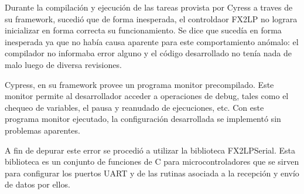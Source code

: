 
Durante la compilación y ejecución de las tareas provista por Cyress a traves de su framework, sucedió que de forma inesperada, el controldaor FX2LP no lograra inicializar en forma correcta su funcionamiento. Se dice que sucedía en forma inesperada ya que no había causa aparente para este comportamiento anómalo: el compilador no informaba error alguno y el código desarrollado no tenía nada de malo luego de diversa revisiones.

Cypress, en su framework provee un programa monitor precompilado. Este monitor permite al desarrollador acceder a operaciones de debug, tales como el chequeo de variables, el pausa y reanudado de ejecuciones, etc. Con este programa monitor ejecutado, la configuración desarrollada se implementó sin problemas aparentes.

A fin de depurar este error se procedió a utilizar la biblioteca FX2LPSerial\cite{Kumar2017}. Esta biblioteca es un conjunto de funciones de C para microcontroladores que se sirven para configurar los puertos UART y de las rutinas asociada a la recepción y envío de datos por ellos.

